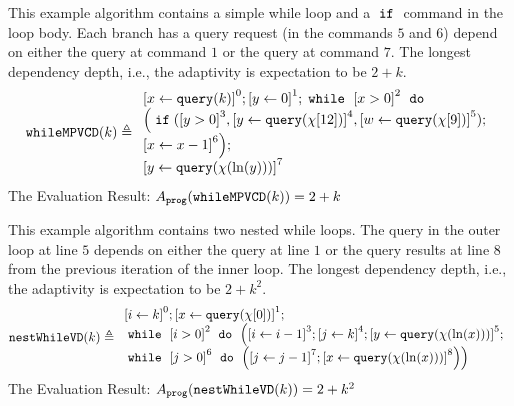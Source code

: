    \begin{example}
\label{ex:whileMPVCD}
%
This example algorithm contains a simple while loop and a $\;\mathtt{if}\;$ command in the loop body.
Each branch  has a query request (in the commands $5$ and $6$)
depend on either the query at command $1$ or the query at command $7$.
The longest dependency depth, i.e., the adaptivity is expectation to be $2 + k$.
\[
    \kw{whileMPVCD}(k) \triangleq
    \begin{array}{l}
        \clabel{ \assign{x}{\query(k)}}^{0} ; 
        \clabel{\assign{y}{0} }^{1} ; 
            \ewhile ~ \clabel{x > 0}^{2} ~ \edo ~ \\
            \Big(
             \eif(\clabel{y > 0}^{3}, 
             \clabel{\assign{y}{\query(\chi[12])}}^{4}, 
             \clabel{\assign{w}{\query(\chi[9])}}^{5});        
             \\
             \clabel{\assign{x}{x-1}}^{6}\Big);\\
             \clabel{\assign{y}{\query(\chi(\ln(y)))} }^{7} 
        \end{array}
    \]
    The Evaluation Result: $ A_{\mathtt{prog}}(\mathtt{whileMPVCD}(k)) = 2 + k $
\end{example}
\begin{example}
    \label{ex:nestWhileVD}
    This example algorithm contains two nested while loops.
    The query in the outer loop at line $5$ depends on either the query at line $1$ or
    the query results at line $8$ from the previous iteration of the inner loop.
    The longest dependency depth, i.e., the adaptivity is expectation to be $2 + k^2$.
    \[
    \kw{nestWhileVD}(k) \triangleq 
    \begin{array}{l}
        \clabel{ \assign{i}{k} }^{0} ; 
        \clabel{\assign{x}{\query(\chi[0])}}^{1} ; \\
            \ewhile ~ \clabel{i > 0}^{2} ~ \edo ~ 
            \Big(
             \clabel{\assign{i}{i-1}}^{3} ;
             \clabel{\assign{j}{k}}^{4} ;
             \clabel{\assign{y}{\query(\chi(\ln(x)))} }^{5}  ; \\
             \ewhile ~ \clabel{j > 0}^{6} ~ \edo ~ 
             \Big(
              \clabel{\assign{j}{j-1}}^{7};
              \clabel{\assign{x}{\query(\chi(\ln(x)))} }^{8}
              \Big) \Big)
        \end{array}
    \]
    The Evaluation Result: $ A_{\mathtt{prog}}(\mathtt{nestWhileVD}(k)) = 2 + k^2 $
\end{example}
    
